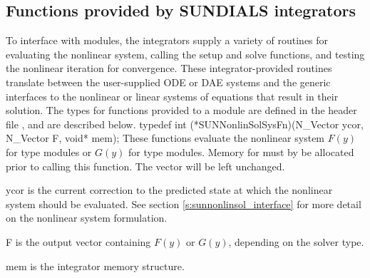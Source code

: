 \subsection{Functions provided by SUNDIALS integrators}
\label{ss:sunnonlinsol_sunsuppliedfn}

To interface with {\sunnonlinsol} modules, the {\sundials} integrators
supply a variety of routines for evaluating the nonlinear system,
calling the {\sunlinsol} setup and solve functions, and testing the
nonlinear iteration for convergence.  These integrator-provided routines
translate between the user-supplied ODE or DAE systems and the generic
interfaces to the nonlinear or linear systems of equations that result
in their solution. The types for functions provided to a {\sunnonlinsol}
module are defined in the header file
, and are described below.
{
  typedef int (*SUNNonlinSolSysFn)(N\_Vector ycor, N\_Vector F, void* mem);
}
{
  These functions evaluate the nonlinear system $F(y)$
  for  type modules or $G(y)$
  for  type modules. Memory
  for  must by be allocated prior to calling this function. The
  vector  will be left unchanged.
}
{
  \begin{args}[ycor]
  \item[ycor]
    is the current correction to the predicted state at which the nonlinear
    system should be evaluated. See section \ref{s:sunnonlinsol_interface}
    for more detail on the nonlinear system formulation.
  \item[F]
    is the output vector containing $F(y)$ or $G(y)$, depending on the
    solver type.
  \item[mem]
    is the {\sundials} integrator memory structure.
  \end{args}
}
